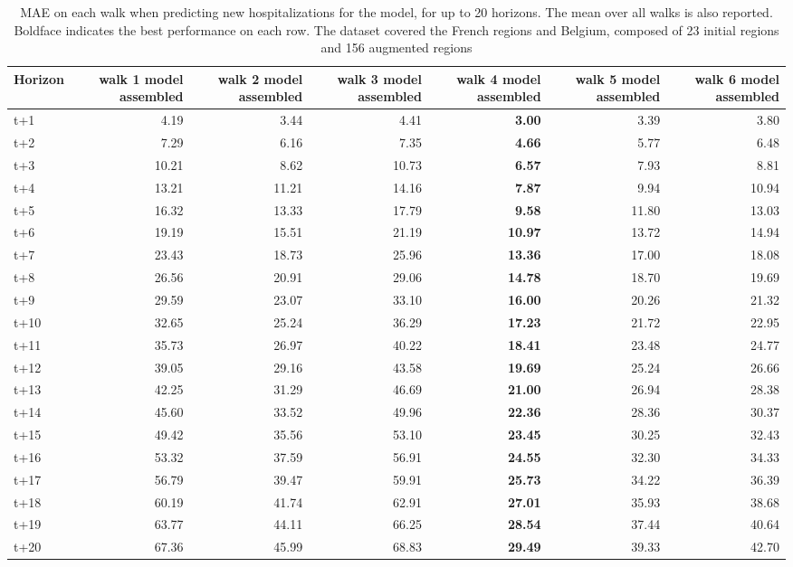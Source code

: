 \begin{table}[H]
\centering
\caption{MAE on each walk when predicting new hospitalizations for the model, for up to 20 horizons. The mean over all walks is also reported. Boldface indicates the best performance on each row. The dataset covered the French regions and Belgium, composed of 23 initial regions and 156 augmented regions }
\label{tab:MAE_walk_assembly}
\begin{tabular}{lrrrrrr}
\toprule
Horizon &  walk 1 model assembled &  walk 2 model assembled &  walk 3 model assembled &  walk 4 model assembled &  walk 5 model assembled &  walk 6 model assembled \\
\midrule
t+1  & 4.19  & 3.44  & 4.41  & \textbf{3.00}  & 3.39  & 3.80  \\
t+2  & 7.29  & 6.16  & 7.35  & \textbf{4.66}  & 5.77  & 6.48  \\
t+3  & 10.21  & 8.62  & 10.73  & \textbf{6.57}  & 7.93  & 8.81  \\
t+4  & 13.21  & 11.21  & 14.16  & \textbf{7.87}  & 9.94  & 10.94  \\
t+5  & 16.32  & 13.33  & 17.79  & \textbf{9.58}  & 11.80  & 13.03  \\
t+6  & 19.19  & 15.51  & 21.19  & \textbf{10.97}  & 13.72  & 14.94  \\
t+7  & 23.43  & 18.73  & 25.96  & \textbf{13.36}  & 17.00  & 18.08  \\
t+8  & 26.56  & 20.91  & 29.06  & \textbf{14.78}  & 18.70  & 19.69  \\
t+9  & 29.59  & 23.07  & 33.10  & \textbf{16.00}  & 20.26  & 21.32  \\
t+10  & 32.65  & 25.24  & 36.29  & \textbf{17.23}  & 21.72  & 22.95  \\
t+11  & 35.73  & 26.97  & 40.22  & \textbf{18.41}  & 23.48  & 24.77  \\
t+12  & 39.05  & 29.16  & 43.58  & \textbf{19.69}  & 25.24  & 26.66  \\
t+13  & 42.25  & 31.29  & 46.69  & \textbf{21.00}  & 26.94  & 28.38  \\
t+14  & 45.60  & 33.52  & 49.96  & \textbf{22.36}  & 28.36  & 30.37  \\
t+15  & 49.42  & 35.56  & 53.10  & \textbf{23.45}  & 30.25  & 32.43  \\
t+16  & 53.32  & 37.59  & 56.91  & \textbf{24.55}  & 32.30  & 34.33  \\
t+17  & 56.79  & 39.47  & 59.91  & \textbf{25.73}  & 34.22  & 36.39  \\
t+18  & 60.19  & 41.74  & 62.91  & \textbf{27.01}  & 35.93  & 38.68  \\
t+19  & 63.77  & 44.11  & 66.25  & \textbf{28.54}  & 37.44  & 40.64  \\
t+20  & 67.36  & 45.99  & 68.83  & \textbf{29.49}  & 39.33  & 42.70  \\

\bottomrule
\end{tabular}
\end{table}
